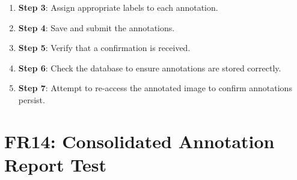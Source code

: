 \documentclass[12pt, titlepage]{article}
\begin{document}
\begin{enumerate}
\begin{itemize}
\begin{enumerate}
            \item \textbf{Step 3}: Assign appropriate labels to each annotation.
            \item \textbf{Step 4}: Save and submit the annotations.
            \item \textbf{Step 5}: Verify that a confirmation is received.
            \item \textbf{Step 6}: Check the database to ensure annotations are stored correctly.
            \item \textbf{Step 7}: Attempt to re-access the annotated image to confirm annotations persist.
        \end{enumerate}
    \end{itemize}
\end{enumerate}

\section*{FR14: Consolidated Annotation Report Test}
\end{document}
